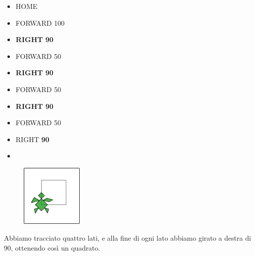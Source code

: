 \begin{scriptsize}
\begin{minipage}{0.45\textwidth}
\begin{itemize}[itemsep=-3pt,parsep=2pt]
\item[] \hspace{0.5cm} HOME 
\item[] \hspace{0.5cm} FORWARD 100
\item[] \hspace{0.5cm} \textbf{RIGHT 90}
\item[] \hspace{0.5cm} FORWARD 50
\item[] \hspace{0.5cm} \textbf{RIGHT 90}
\item[] \hspace{0.5cm} FORWARD 50
\item[] \hspace{0.5cm} \textbf{RIGHT 90}
\item[] \hspace{0.5cm} FORWARD 50
\item[] \hspace{0.5cm} RIGHT \textbf{90} 
\item[] \hspace{0.5cm} 
\end{itemize}
\end{minipage}
\end{scriptsize}
\begin{minipage}{0.5\textwidth}
\begin{figure}[H]
   \includegraphics[width=3.0cm,trim=4 4 8 4,clip]{./images/disegnare/disegnare-3.png}
   \label{dis-3}
\end{figure}
\end{minipage} \hfill

\vskip 1cm

Abbiamo tracciato quattro lati, e alla fine di ogni lato abbiamo girato a destra di 90\degree, ottenendo così un quadrato.
  
